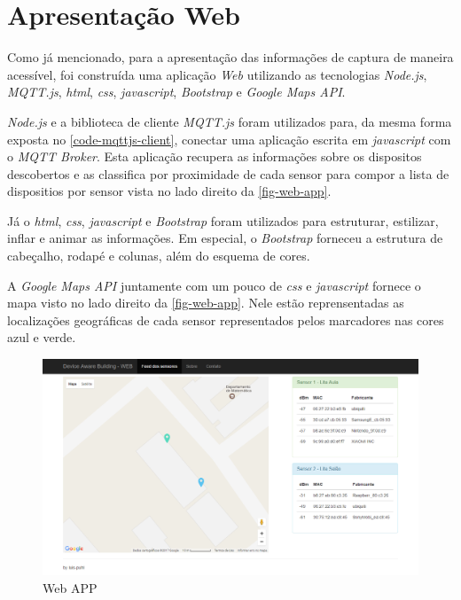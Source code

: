 \section{Apresentação Web}
\label{sec:app-web}

Como já mencionado, para a apresentação das informações de captura de maneira
acessível, foi construída uma aplicação \emph{Web} utilizando as tecnologias
\emph{Node.js}, \emph{MQTT.js}, \emph{html}, \emph{css}, \emph{javascript},
\emph{Bootstrap} e \emph{Google Maps API}.

\emph{Node.js} e a biblioteca de cliente \emph{MQTT.js} foram utilizados para,
da mesma forma exposta no \autoref{code-mqttjs-client}, conectar
uma aplicação escrita em \emph{javascript} com o \emph{MQTT Broker}. Esta
aplicação recupera as informações sobre os dispositos descobertos e as
classifica por proximidade de cada sensor para compor a lista de dispositios
por sensor vista no lado direito da \autoref{fig-web-app}.

Já o \emph{html}, \emph{css}, \emph{javascript} e \emph{Bootstrap} foram
utilizados para estruturar, estilizar, inflar e animar as informações. Em
especial, o \emph{Bootstrap} forneceu a estrutura de cabeçalho, rodapé e colunas,
além do esquema de cores.

A \emph{Google Maps API} juntamente com um pouco de \emph{css} e
\emph{javascript} fornece o mapa visto no lado direito da \autoref{fig-web-app}.
Nele estão reprensentadas as localizações geográficas de cada sensor
representados pelos marcadores nas cores azul e verde.

\begin{figure}[htb]
	\caption{\label{fig-web-app}Web APP}
	\begin{center}
		\includegraphics[width=1\textwidth]{053-web/web-app.png}
	\end{center}
\end{figure}
